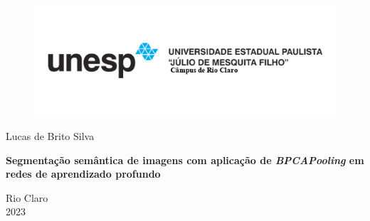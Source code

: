 \begin{titlepage}
    \begin{figure}[H]
        \centering
        \includegraphics[width=1\linewidth]{recursos/imagens/capa/unesp.png}
    \end{figure}
   \begin{center}

       \vspace*{1cm}

       \Large Lucas de Brito Silva

       \vspace*{2.3cm}
       
       \textbf{Segmentação semântica de imagens com aplicação de \textit{BPCAPooling} em redes de aprendizado profundo}
       \normalsize
       
       \vspace{1.5cm}


       \vfill
            
       Rio Claro \\
       2023
            
   \end{center}
\end{titlepage}
